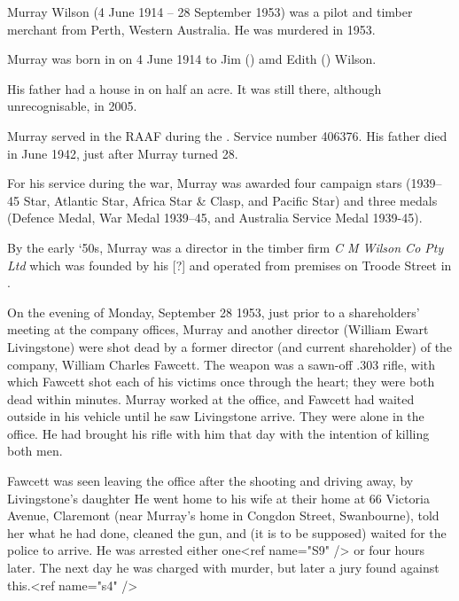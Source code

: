 
Murray Wilson (4 June 1914 -- 28 September 1953) was a pilot and timber merchant from Perth, Western Australia. He was murdered in 1953.

Murray was born in \cite{WABMD208} on 4 June 1914 to Jim () amd Edith () Wilson.

His father had a house in  on half an acre.  It was still there, although unrecognisable, in 2005.

Murray served in the RAAF during the . Service number 406376.\cite{NAAA9300} His father died in June 1942, just after Murray turned 28.

For his service during the war, Murray was awarded\cite{RMWDeptAirLetter} four campaign stars (1939--45 Star, Atlantic Star, Africa Star \& Clasp, and Pacific Star) and three medals (Defence Medal, War Medal 1939--45, and Australia Service Medal 1939-45).


By the early `50s, Murray was a director in the timber firm \emph{C M Wilson Co Pty Ltd} which was founded by his [?] and operated from premises on Troode Street in .\cite{CompanyChiefs}

On the evening of Monday, September 28 1953,\cite{WADeaths, WestAusDeathNotices, VictimEstate} just prior to a shareholders' meeting at the company offices, Murray and another director (William Ewart Livingstone) were shot dead by a former director\cite{InsanityVerdict} (and current shareholder) of the company, William Charles Fawcett.  The weapon was a sawn-off .303 rifle,\cite{GuiltyInsane, CompanyChiefs, TimberDirectors} with which Fawcett shot each of his victims once through the heart; they were both dead within minutes.\cite{CompanyChiefs}  Murray worked at the office, and Fawcett had waited outside in his vehicle until he saw Livingstone arrive.\cite{MurderDirectors} They were alone in the office.\cite{NewAngle} He had brought his rifle with him that day with the intention of killing both men.\cite{DoubleMurder}

Fawcett was seen leaving the office after the shooting and driving away, by Livingstone's daughter\cite{FawcettRemanded} He went home to his wife at their home at 66 Victoria Avenue, Claremont (near Murray's home in Congdon Street, Swanbourne)\cite{FawcettRemanded}, told her what he had done, cleaned the gun, and (it is to be supposed) waited for the police to arrive.\cite{DoubleMurder}  He was arrested either one<ref name="S9" /> or four\cite{SMHDoubleMurder} hours later.  The next day he was charged with murder,\cite{SMHDoubleMurder} but later a jury found against this.<ref name="s4" />

